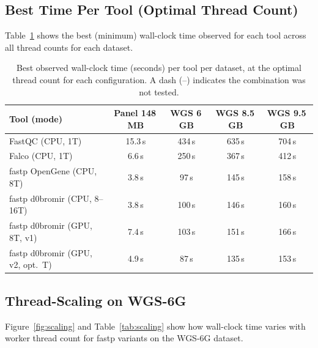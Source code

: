 \documentclass[a4paper,12pt]{article}
\begin{document}
\subsection{Best Time Per Tool (Optimal Thread Count)}

Table~\ref{tab:best} shows the best (minimum) wall-clock time observed for
each tool across all thread counts for each dataset.

\begin{table}[H]
  \centering
  \caption{Best observed wall-clock time (seconds) per tool per dataset, at
    the optimal thread count for each configuration.  A dash (--) indicates
    the combination was not tested.}
  \label{tab:best}
  \setlength{\tabcolsep}{6pt}
  \begin{tabular}{lcccc}
    \toprule
    \textbf{Tool (mode)} & \textbf{Panel 148\,MB} & \textbf{WGS 6\,GB} & \textbf{WGS 8.5\,GB} & \textbf{WGS 9.5\,GB} \\
    \midrule
    FastQC  (CPU, 1T)           & 15.3\,s &  434\,s &  635\,s &  704\,s \\
    Falco   (CPU, 1T)           &  6.6\,s &  250\,s &  367\,s &  412\,s \\
    fastp OpenGene (CPU, 8T)    &  3.8\,s &   97\,s &  145\,s &  158\,s \\
    fastp d0bromir (CPU, 8--16T)&  3.8\,s &  100\,s &  146\,s &  160\,s \\
    fastp d0bromir (GPU, 8T, v1)  &  7.4\,s &  103\,s &  151\,s &  166\,s \\
    fastp d0bromir (GPU, v2, opt.~T) &  4.9\,s &   87\,s &  135\,s &  153\,s \\
    \bottomrule
  \end{tabular}
\end{table}

\subsection{Thread-Scaling on WGS-6G}
\label{sec:scaling}

Figure~\ref{fig:scaling} and Table~\ref{tab:scaling} show how wall-clock time
varies with worker thread count for fastp variants on the WGS-6G dataset.
\end{document}

